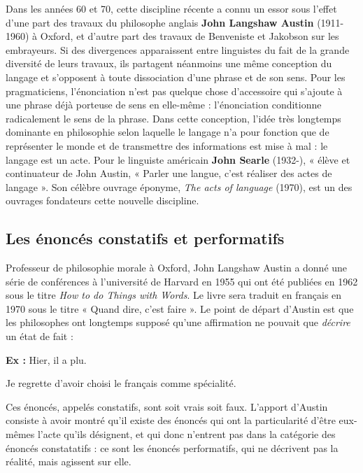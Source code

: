 Dans les années 60 et 70, cette discipline récente a connu un essor sous l’effet d’une part des travaux du philosophe anglais \textbf{John Langshaw Austin} (1911-1960) à Oxford, et d’autre part des travaux de Benveniste et Jakobson sur les embrayeurs. Si des divergences apparaissent entre linguistes du fait de la grande diversité de leurs travaux, ils partagent néanmoins une même conception du langage et s’opposent à toute dissociation d’une phrase et de son sens. Pour les pragmaticiens, l’énonciation n’est pas quelque chose d’accessoire qui s’ajoute à une phrase déjà porteuse de sens en elle-même : l’énonciation conditionne radicalement le sens de la phrase. Dans cette conception, l’idée très longtemps dominante en philosophie selon laquelle le langage n’a pour fonction que de représenter le monde et de transmettre des informations est mise à mal : le langage est un acte. Pour le linguiste américain \textbf{John Searle} (1932-), « élève et continuateur de John Austin, « Parler une langue, c’est réaliser des actes de langage ». Son célèbre ouvrage éponyme, \textit{The acts of language} (1970), est un des ouvrages fondateurs cette nouvelle discipline.

\subsection{Les énoncés constatifs et performatifs}
Professeur de philosophie morale à Oxford, John Langshaw Austin a donné une série de conférences à l’université de Harvard en 1955 qui ont été publiées en 1962 sous le titre \textit{How to do Things with Words}. Le livre sera traduit en français en 1970 sous le titre « Quand dire, c’est faire ». Le point de départ d’Austin est que les philosophes ont longtemps supposé qu’une affirmation ne pouvait que \textit{décrire} un état de fait :

\textbf{Ex :} Hier, il a plu.

\hspace*{1.5em}Je regrette d’avoir choisi le français comme spécialité.

Ces énoncés, appelés constatifs, sont soit vrais soit faux. L’apport d’Austin consiste à avoir montré qu’il existe des énoncés qui ont la particularité d’être eux-mêmes l’acte qu’ils désignent, et qui donc n’entrent pas dans la catégorie des énoncés constatatifs : ce sont les énoncés performatifs, qui ne décrivent pas la réalité, mais agissent sur elle.


